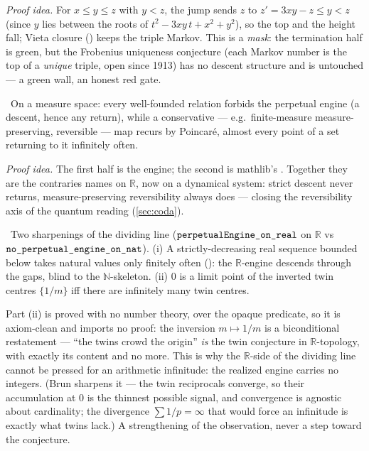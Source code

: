 \emph{Proof idea.} For $x \le y \le z$ with $y < z$, the jump sends $z$ to $z' = 3xy-z \le y < z$ (since
$y$ lies between the roots of $t^2 - 3xy\,t + x^2 + y^2$), so the top and the height fall; Vieta closure
() keeps the triple Markov. This is a \emph{mask}: the termination half is green,
but the Frobenius uniqueness conjecture (each Markov number is the top of a \emph{unique} triple, open
since 1913) has no descent structure and is untouched --- a green wall, an honest red gate.

\begin{theorem}\label{thm:poincare_dividing_line}
\green{}\ On a measure space: every well-founded relation forbids the perpetual engine (a descent,
hence any return), while a conservative --- e.g.\ finite-measure measure-preserving, reversible --- map
recurs by Poincar\'e, almost every point of a set returning to it infinitely often.
\end{theorem}

\emph{Proof idea.} The first half is the engine; the second is mathlib's
. Together they are the contraries
 names on $\mathbb{R}$, now on a dynamical system: strict
descent never returns, measure-preserving reversibility always does --- closing the reversibility axis
of the quantum reading (\cref{sec:coda}).

\begin{theorem}\label{thm:reciprocal_dividing_line}
\green{}\ Two sharpenings of the dividing line ($\texttt{perpetualEngine\_on\_real}$ on $\mathbb{R}$ vs
$\texttt{no\_perpetual\_engine\_on\_nat}$). (i) A strictly-decreasing real sequence bounded below takes
natural values only finitely often (): the $\mathbb{R}$-engine
descends through the gaps, blind to the $\mathbb{N}$-skeleton. (ii) $0$ is a limit point of the inverted
twin centres $\{1/m\}$ iff there are infinitely many twin centres.
\end{theorem}

\begin{remark}
Part (ii) is proved with no number theory, over the opaque predicate, so it is axiom-clean and imports
no proof: the inversion $m\mapsto 1/m$ is a biconditional restatement --- ``the twins crowd the origin''
\emph{is} the twin conjecture in $\mathbb{R}$-topology, with exactly its content and no more. This is why
the $\mathbb{R}$-side of the dividing line cannot be pressed for an arithmetic infinitude: the realized
engine carries no integers. (Brun sharpens it --- the twin reciprocals converge, so their accumulation
at $0$ is the thinnest possible signal, and convergence is agnostic about cardinality; the divergence
$\sum 1/p = \infty$ that would force an infinitude is exactly what twins lack.) A strengthening of the
observation, never a step toward the conjecture.
\end{remark}

